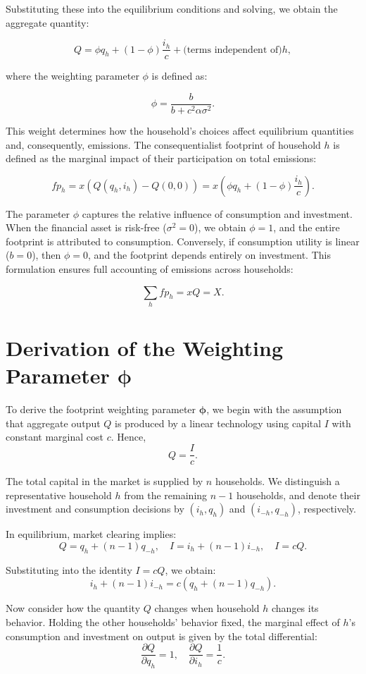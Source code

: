 \documentclass[12pt,a4paper]{article}%
\begin{document}
Substituting these into the equilibrium conditions and solving, we obtain the aggregate quantity:

\[
Q = \phi q_h + (1 - \phi) \frac{i_h}{c} + \text{(terms independent of)} h,
\]

where the weighting parameter $\phi$ is defined as:

\[
\phi = \frac{b}{b + c^2 \alpha \sigma^2}.
\]

This weight determines how the household’s choices affect equilibrium quantities and, consequently, emissions. The consequentialist footprint of household $h$ is defined as the marginal impact of their participation on total emissions:

\[
fp_h = x \left( Q(q_h, i_h) - Q(0, 0) \right) = x \left( \phi q_h + (1 - \phi) \frac{i_h}{c} \right).
\]


The parameter $\phi$ captures the relative influence of consumption and investment. When the financial asset is risk-free ($\sigma^2 = 0$), we obtain $\phi = 1$, and the entire footprint is attributed to consumption. Conversely, if consumption utility is linear ($b = 0$), then $\phi = 0$, and the footprint depends entirely on investment. This formulation ensures full accounting of emissions across households:

\[
\sum_h fp_h = xQ = X.
\]
\section{Derivation of the Weighting Parameter \( \boldsymbol{\phi} \)}

To derive the footprint weighting parameter \( \boldsymbol{\phi} \), we begin with the assumption that aggregate output \( Q \) is produced by a linear technology using capital \( I \) with constant marginal cost \( c \). Hence,
\[
Q = \frac{I}{c}.
\]

The total capital in the market is supplied by \( n \) households. We distinguish a representative household \( h \) from the remaining \( n - 1 \) households, and denote their investment and consumption decisions by \( (i_h, q_h) \) and \( (i_{-h}, q_{-h}) \), respectively.

In equilibrium, market clearing implies:
\[
Q = q_h + (n - 1) q_{-h}, \quad I = i_h + (n - 1) i_{-h}, \quad I = cQ.
\]

Substituting into the identity \( I = cQ \), we obtain:
\[
i_h + (n - 1) i_{-h} = c \left( q_h + (n - 1) q_{-h} \right).
\]

Now consider how the quantity \( Q \) changes when household \( h \) changes its behavior. Holding the other households' behavior fixed, the marginal effect of \( h \)'s consumption and investment on output is given by the total differential:
\[
\frac{\partial Q}{\partial q_h} = 1, \quad \frac{\partial Q}{\partial i_h} = \frac{1}{c}.
\]
\end{document}
